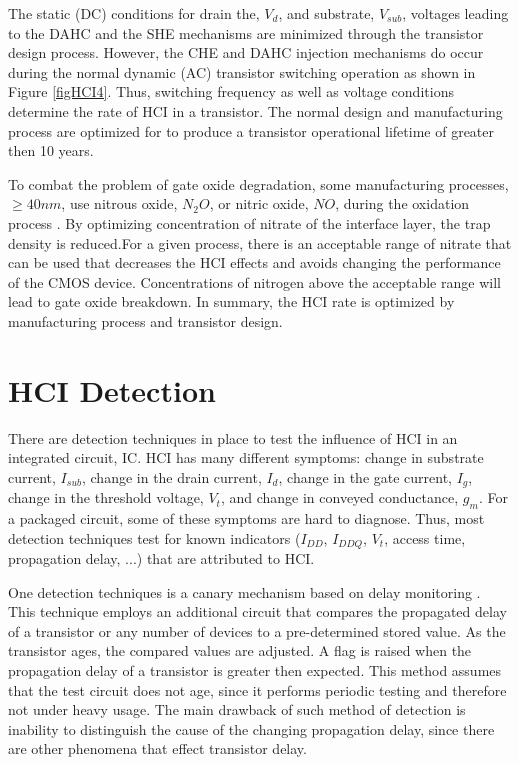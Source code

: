 \documentclass[12pt,conference]{IEEEtran}
\begin{document}
\begin{comment}
\begin{figure}[htp]
\centering{
\texttt{[image: Fig/trojanhci\_fig04.jpg]}
}
\caption{HCI recovery}
\label{figHCI4}
\end{figure}
\end{comment}
The static (DC) conditions for drain the, $V_d$, and substrate, $V_{sub}$,
voltages leading to the DAHC and the SHE mechanisms are
minimized through the transistor design process.  However, the CHE and DAHC
injection mechanisms do occur during the normal dynamic (AC) transistor
switching operation as shown in Figure \ref{figHCI4}.
Thus, switching frequency as well as voltage
conditions determine the rate of HCI in a transistor.  The normal design and manufacturing process are optimized for to produce a transistor operational lifetime of greater then 10 years. 

To combat the problem of gate oxide 
degradation, some manufacturing processes, $\geq 40nm$,
use nitrous oxide, $N_2O$, or nitric oxide, $NO$, during
the oxidation process \cite{NOX92A,NOX92B}.
By optimizing concentration of nitrate of the interface layer, the trap density is reduced.For a given process, there is an acceptable range of
nitrate that can be used that decreases the HCI effects and
avoids changing the performance of the CMOS device.
Concentrations of nitrogen above the acceptable range will lead to gate oxide breakdown. In summary, the HCI rate is optimized by manufacturing process and transistor design.   

\section*{HCI Detection}

There are detection techniques in place to test the influence of
HCI in an integrated circuit, IC.    HCI has many different symptoms: change in substrate
current, $I_{sub}$, change in the drain current, $I_d$, change in the
gate current, $I_g$, change in the threshold voltage, $V_t$, and
change in conveyed conductance, $g_m$.
For a packaged circuit, some of these symptoms are hard to diagnose.
Thus, most detection techniques test for known indicators ($I_{DD}$, $I_{DDQ}$, $V_t$, access time, propagation delay, ...) that are
attributed to HCI.

One detection techniques is a canary mechanism based
on delay monitoring \cite{DELAY04A,DETECT06A,DELAY07A,DELAY08A}.
This technique employs an additional circuit that compares
the propagated delay of a transistor or any number of
devices to a pre-determined stored value.
As the transistor ages, the compared values are
adjusted.
A flag is raised when the propagation delay of a transistor
is greater then expected.  This method assumes that the test circuit does not age, since it performs periodic testing and therefore not under heavy usage.
The main drawback of such method of detection is inability to distinguish the cause of the changing propagation delay,  since there are other phenomena that effect transistor delay. 
\end{document}
